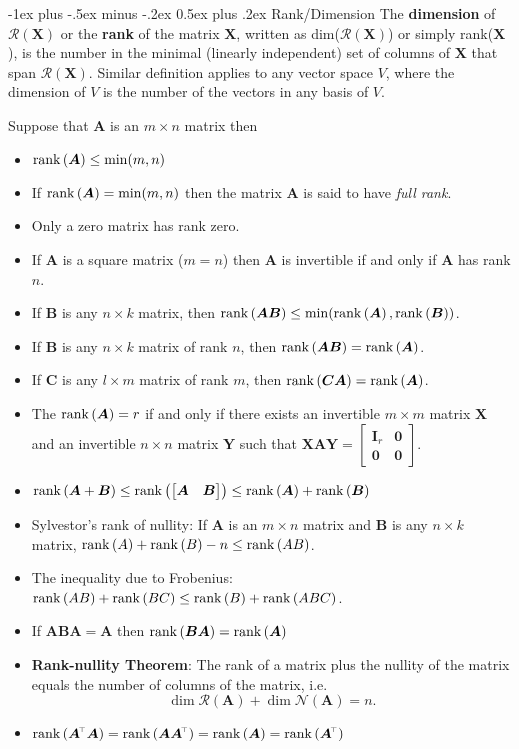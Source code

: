\documentclass[12pt,landscape, a4paper]{article}
\makeatletter
\newcommand{\bs}[1]{\ensuremath{\boldsymbol{#1}}}
\newcommand{\tp}{{\!\scriptscriptstyle \top}}
\renewcommand{\section}{\@startsection{section}{1}{0mm}%
                                {-1ex plus -.5ex minus -.2ex}%
                                {0.5ex plus .2ex}%
                                {\normalfont\large\bfseries}}
\newcommand{\rank}[1]{{\rm rank}\left(#1\right)}
\makeatother
\begin{document}
\begin{multicols}{3}
\section{Rank/Dimension}
The \textbf{dimension} of $\mathcal{R}(\bs{X})$ or the \textbf{rank} of the matrix \bs{X}, written as dim($\mathcal{R}(\bs{X})$) or simply rank(\bs{X}), is the number in the minimal (linearly independent) set of columns of \bs{X} that span $\mathcal{R}(\bs{X})$. Similar definition applies to any vector space $V$, where the dimension of $V$ is the number of the vectors in any basis of $V$. 

Suppose that $\bs{A}$ is an $m\times n$ matrix then
\begin{itemize}
	\item $\rank{\bs{A}} \leq \min (m,n)$
	\item If $\rank{\bs{A}} = \min (m,n)$ then the matrix $\bs{A}$ is said to have \emph{full rank}.
	\item Only a zero matrix has rank zero. 
	\item If $\bs{A}$ is a square matrix ($m=n$) then $\bs{A}$ is invertible if and only if $\bs{A}$ has rank $n$. 
	\item If $\bs{B}$ is any $n\times k$ matrix, then $\rank{\bs{A}\bs{B}} \leq \min(\rank{\bs{A}}, \rank{\bs{B}})$.
	\item  If $\bs{B}$ is any $n\times k$ matrix of rank $n$, then $\rank{\bs{A}\bs{B}} = \rank{\bs{A}}$.
	\item  If $\bs{C}$ is any $l\times m$ matrix of rank $m$, then $\rank{\bs{C}\bs{A}} = \rank{\bs{A}}$.
	\item The $\rank{\bs{A}}=r$ if and only if there exists an invertible $m\times m$ matrix $\bs{X}$ and an invertible $n\times n$ matrix $\bs{Y}$ such that $\bs{X}\bs{A}\bs{Y} = \begin{bmatrix}
	\bs{I}_r & \bs{0} \\
	\bs{0} & \bs{0}
	\end{bmatrix}$. 
	\item $\rank{\bs{A} + \bs{B}} \leq \rank{\begin{bmatrix}
		\bs{A} & \bs{B}
		\end{bmatrix}} \leq \rank{\bs{A}} + \rank{\bs{B}}$
	\item Sylvestor's rank of nullity: If $\bs{A}$ is an $m\times n$ matrix and $\bs{B}$ is any $n\times k$ matrix, $\rank{A} + \rank{B} - n \leq \rank{AB}$.
	\item The inequality due to Frobenius: $\rank{AB} + \rank{BC} \leq \rank{B} + \rank{ABC}$.
	\item If $\bs{A}\bs{B}\bs{A} = \bs{A}$ then $\rank{\bs{B}\bs{A}} = \rank{\bs{A}}$
	\item \textbf{Rank-nullity Theorem}: The rank of a matrix plus the nullity of the matrix equals the number of columns of the matrix, i.e. $$\dim{\mathcal{R}(\bs{A})} + \dim{\mathcal{N}(\bs{A})} = n.$$
	\item $\rank{\bs{A}^\tp \bs{A}} = \rank{\bs{A}\bs{A}^\tp} = \rank{\bs{A}} = \rank{\bs{A}^\tp}$
\end{itemize}


\end{multicols}
\end{document}
